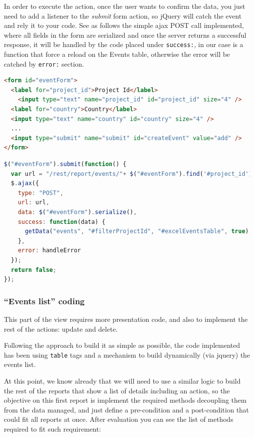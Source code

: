 In order to execute the action, once the user wants to confirm the data, you
just need to add a listener to the \emph{submit} form action, so jQuery will
catch the event and rely it to your code. See as follows the simple ajax POST
call implemented, where all fields in the form are serialized and once the
server returns a successful response, it will be handled by the code placed
under \texttt{success:}, in our case is a function that force a reload on the Events
table, otherwise the error will be catched by \texttt{error:} section.
\\

\begin{lstlisting}[language=HTML,breaklines=true,caption=Add\ new\ Event\
HTML\ code,label=f_migration_addnewevent_html]
<form id="eventForm">
  <label for="project_id">Project Id</label>
    <input type="text" name="project_id" id="project_id" size="4" />
  <label for="country">Country</label>
  <input type="text" name="country" id="country" size="4" /> 
  ...
  <input type="submit" name="submit" id="createEvent" value="add" />
</form>
\end{lstlisting}

\begin{lstlisting}[language=Javascript,breaklines=true,caption=Add\ new\ Event\
jQuery\ code,label=f_migration_addnewevent_jquery] 
$("#eventForm").submit(function() { 
  var url = "/rest/report/events/"+ $("#eventForm").find('#project_id').val();
  $.ajax({ 
    type: "POST", 
    url: url, 
    data: $("#eventForm").serialize(),
    success: function(data) {
      getData("events", "#filterProjectId", "#excelEventsTable", true);
    },
    error: handleError
  });
  return false;
});
\end{lstlisting}

\subsubsection{``Events list'' coding}
\label{sec:eventlist}

This part of the view requires more presentation code, and also to
implement the rest of the actions: update and delete.

Following the approach to build it as simple as possible, the code implemented
has been using \texttt{table} tags and a mechanism to build dynamically (via
jquery) the events list. 

At this point, we know already that we will need to use a similar logic to build
the rest of the reports that show a list of details including an action, so the
objective on this first report is implement the required methods decoupling them
from the data managed, and just define a pre-condition and a post-condition that
could fit all reports at once. After evaluation you can see the list of methods
required to fit such requirement:

